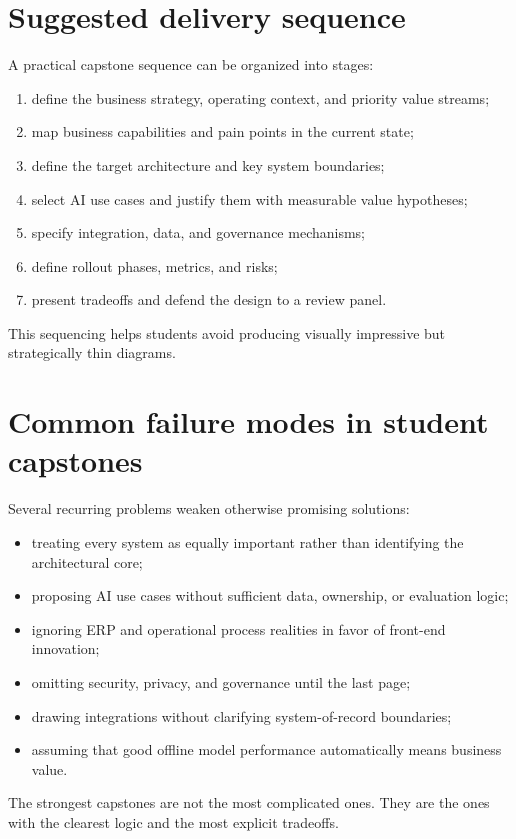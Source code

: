 \section{Suggested delivery sequence}
A practical capstone sequence can be organized into stages:
\begin{enumerate}
  \item define the business strategy, operating context, and priority value streams;
  \item map business capabilities and pain points in the current state;
  \item define the target architecture and key system boundaries;
  \item select AI use cases and justify them with measurable value hypotheses;
  \item specify integration, data, and governance mechanisms;
  \item define rollout phases, metrics, and risks;
  \item present tradeoffs and defend the design to a review panel.
\end{enumerate}

This sequencing helps students avoid producing visually impressive but strategically thin diagrams.

\section{Common failure modes in student capstones}
Several recurring problems weaken otherwise promising solutions:
\begin{itemize}
  \item treating every system as equally important rather than identifying the architectural core;
  \item proposing AI use cases without sufficient data, ownership, or evaluation logic;
  \item ignoring ERP and operational process realities in favor of front-end innovation;
  \item omitting security, privacy, and governance until the last page;
  \item drawing integrations without clarifying system-of-record boundaries;
  \item assuming that good offline model performance automatically means business value.
\end{itemize}

The strongest capstones are not the most complicated ones. They are the ones with the clearest logic and the most explicit tradeoffs.


